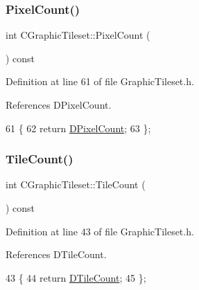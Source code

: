 \subsubsection{\texorpdfstring{Pixel\+Count()}{PixelCount()}}
{\footnotesize\ttfamily int C\+Graphic\+Tileset\+::\+Pixel\+Count (\begin{DoxyParamCaption}{ }\end{DoxyParamCaption}) const\hspace{0.3cm}{\ttfamily [inline]}}



Definition at line 61 of file Graphic\+Tileset.\+h.



References D\+Pixel\+Count.


\begin{DoxyCode}
61                               \{
62             \textcolor{keywordflow}{return} \hyperlink{classCGraphicTileset_a55fc9ceb1c92383c124e61c911fe57db}{DPixelCount};
63         \};
\end{DoxyCode}
\hypertarget{classCGraphicTileset_a0d2f8ba4131b180243df3819cde783c3}{}\label{classCGraphicTileset_a0d2f8ba4131b180243df3819cde783c3} 
\subsubsection{\texorpdfstring{Tile\+Count()}{TileCount()}\hspace{0.1cm}{\footnotesize\ttfamily [1/2]}}
{\footnotesize\ttfamily int C\+Graphic\+Tileset\+::\+Tile\+Count (\begin{DoxyParamCaption}{ }\end{DoxyParamCaption}) const\hspace{0.3cm}{\ttfamily [inline]}}



Definition at line 43 of file Graphic\+Tileset.\+h.



References D\+Tile\+Count.


\begin{DoxyCode}
43                              \{
44             \textcolor{keywordflow}{return} \hyperlink{classCGraphicTileset_a39d942b370e47f441bf97385eb1037c8}{DTileCount};
45         \};
\end{DoxyCode}
\hypertarget{classCGraphicTileset_a98f779275d9009a01e042d7a240ae995}{}\label{classCGraphicTileset_a98f779275d9009a01e042d7a240ae995} 

